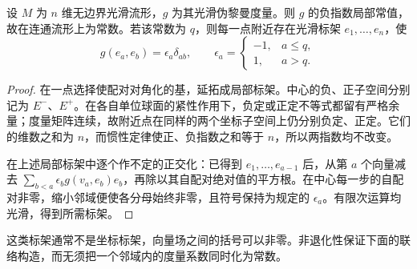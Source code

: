 \begin{proposition}\label{g3:prop:A-index-local-constant}
	设 \(M\) 为 \(n\) 维无边界光滑流形，\(g\) 为其光滑伪黎曼度量。则 \(g\) 的负指数局部常值，故在连通流形上为常数。若该常数为 \(q\)，则每一点附近存在光滑标架 \(e_1,\ldots,e_n\)，使
	\[
		g(e_a,e_b)=\epsilon_a\delta_{ab},\qquad
		\epsilon_a=
		\begin{cases}
			-1,&a\le q,\\
			1,&a>q.
		\end{cases}
	\]
\end{proposition}
\begin{proof}
	在一点选择使配对对角化的基，延拓成局部标架。中心的负、正子空间分别记为 \(E^-\)、\(E^+\)。在各自单位球面的紧性作用下，负定或正定不等式都留有严格余量；度量矩阵连续，故附近点在同样的两个坐标子空间上仍分别负定、正定。它们的维数之和为 \(n\)，而惯性定律使正、负指数之和等于 \(n\)，所以两指数均不改变。

	在上述局部标架中逐个作不定的正交化：已得到 \(e_1,\ldots,e_{a-1}\) 后，从第 \(a\) 个向量减去
	\(\sum_{b<a}\epsilon_b g(v_a,e_b)e_b\)，再除以其自配对绝对值的平方根。在中心每一步的自配对非零，缩小邻域便使各分母始终非零，且符号保持为规定的 \(\epsilon_a\)。有限次运算均光滑，得到所需标架。
\end{proof}

这类标架通常不是坐标标架，向量场之间的括号可以非零。非退化性保证下面的联络构造，而无须把一个邻域内的度量系数同时化为常数。

